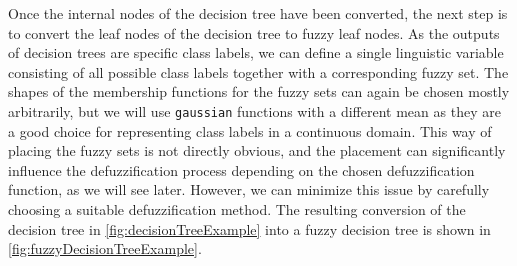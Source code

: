 Once the internal nodes of the decision tree have been converted, the next step is to convert the leaf nodes of the decision tree to fuzzy leaf nodes. As the outputs of decision trees are specific class labels, we can define a single linguistic variable consisting of all possible class labels together with a corresponding fuzzy set. The shapes of the membership functions for the fuzzy sets can again be chosen mostly arbitrarily, but we will use \texttt{gaussian} functions with a different mean as they are a good choice for representing class labels in a continuous domain. This way of placing the fuzzy sets is not directly obvious, and the placement can significantly influence the defuzzification process depending on the chosen defuzzification function, as we will see later. However, we can minimize this issue by carefully choosing a suitable defuzzification method.
The resulting conversion of the decision tree in \autoref{fig:decisionTreeExample} into a fuzzy decision tree is shown in \autoref{fig:fuzzyDecisionTreeExample}.


